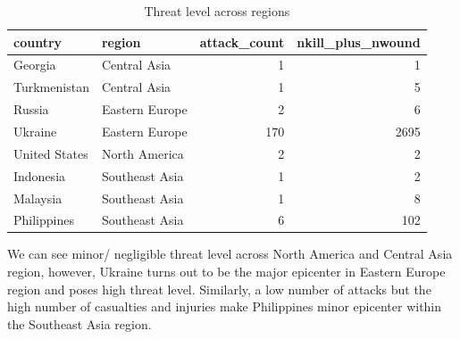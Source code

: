 \documentclass[11pt,oneside,a4paper]{reedthesis}
\begin{document}
\begin{table}[H]

\caption{\label{tab:unnamed-chunk-17}Threat level across regions}
\centering
\fontsize{12}{14}\selectfont
\begin{tabular}[t]{llrr}
\toprule
country & region & attack\_count & nkill\_plus\_nwound\\
\midrule
Georgia & Central Asia & 1 & 1\\
Turkmenistan & Central Asia & 1 & 5\\
Russia & Eastern Europe & 2 & 6\\
Ukraine & Eastern Europe & 170 & 2695\\
United States & North America & 2 & 2\\
\addlinespace
Indonesia & Southeast Asia & 1 & 2\\
Malaysia & Southeast Asia & 1 & 8\\
Philippines & Southeast Asia & 6 & 102\\
\bottomrule
\end{tabular}
\end{table}
We can see minor/ negligible threat level across North America and
Central Asia region, however, Ukraine turns out to be the major
epicenter in Eastern Europe region and poses high threat level.
Similarly, a low number of attacks but the high number of casualties and
injuries make Philippines minor epicenter within the Southeast Asia
region.
\end{document}
